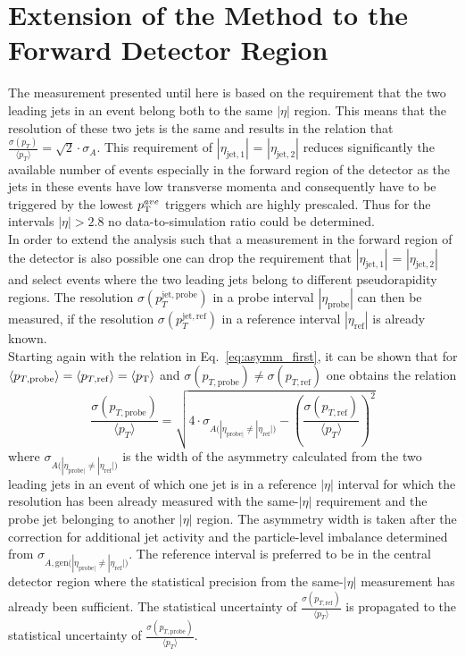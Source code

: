 \section{Extension of the Method to the Forward Detector Region}
\label{sec:jer_forward_extension}
The measurement presented until here is based on the requirement that the two leading jets in an event belong both to the same $|\eta|$ region. This means that the resolution of these two jets is the same and results in the relation that $\frac{\sigma (p_{T})}{\langle p_{T} \rangle} = \sqrt{2} \cdot \sigma_{A}$. This requirement of $|\eta_{\mathrm{jet},1}|$ = $|\eta_{\mathrm{jet},2}|$ reduces significantly the available number of events especially in the forward region of the detector as the jets in these events have low transverse momenta and consequently have to be triggered by the lowest $p_{\text{T}}^{ave}$ triggers which are highly prescaled. Thus for the intervals $|\eta| > 2.8$ no data-to-simulation ratio could be determined. \\
In order to extend the analysis such that a measurement in the forward region of the detector is also possible one can drop the requirement that $|\eta_{\mathrm{jet},1}|$ = $|\eta_{\mathrm{jet},2}|$ and select events where the two leading jets belong to different pseudorapidity regions. The resolution $\sigma (p_{T}^{\mathrm{jet, probe}})$ in a probe interval $|\eta_\mathrm{probe}|$ can then be measured, if the resolution $\sigma (p_{T}^{\mathrm{jet, ref}})$ in a reference interval $|\eta_\mathrm{ref}|$ is already known. \\
Starting again with the relation in Eq.~\ref{eq:asymm_first}, it can be shown that for $\langle p_{T,\mathrm{probe}} \rangle = \langle p_{T,\mathrm{ref}} \rangle = \langle p_{\text{T}} \rangle$ and $\sigma (p_{T,\mathrm{probe}}) \neq \sigma (p_{T,\mathrm{ref}})$ one obtains the relation
\begin{equation}
 \label{eq:asymm_forward}
  \frac{\sigma (p_{T, \mathrm{probe}})}{\langle p_{T} \rangle} = \sqrt{4 \cdot \sigma_{A({|\eta_{\mathrm{probe}|} \neq |\eta_{\mathrm{ref}}|)}} - \left(\frac{\sigma (p_{T, \mathrm{ref}})}{\langle p_{T} \rangle} \right)^2} 
 \end{equation}
where $\sigma_{A({|\eta_{\mathrm{probe}|} \neq |\eta_{\mathrm{ref}}|)}}$ is the width of the asymmetry calculated from the two leading jets in an event of which one jet is in a reference $|\eta|$ interval for which the resolution has been already measured with the same-$|\eta|$ requirement and the probe jet belonging to another $|\eta|$ region. The asymmetry width is taken after the correction for additional jet activity and the particle-level imbalance determined from $\sigma_{A, \mathrm{gen} ({|\eta_{\mathrm{probe}|} \neq |\eta_{\mathrm{ref}}|)}}$. The reference interval is preferred to be in the central detector region where the statistical precision from the same-$|\eta|$ measurement has already been sufficient. The statistical uncertainty of $\frac{\sigma (p_{T, \mathrm{ref}})}{{\langle p_{T} \rangle}}$ is propagated to the statistical uncertainty of $\frac{\sigma (p_{T, \mathrm{probe}})}{\langle p_{T} \rangle}$. \\
